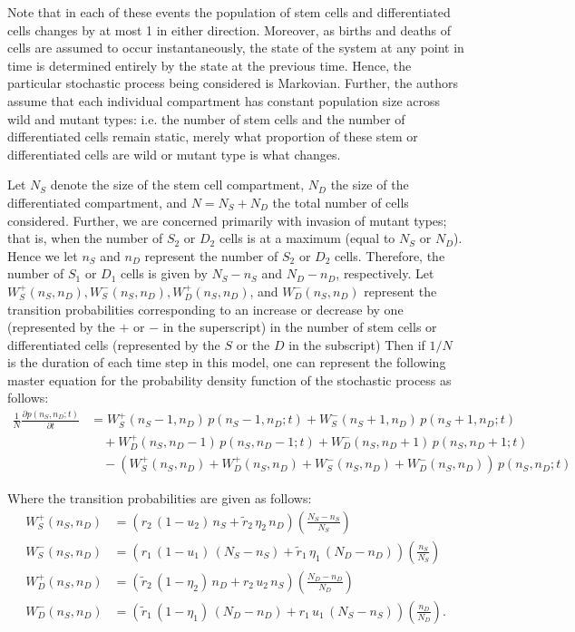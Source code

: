 \documentclass[12pt]{article}
\begin{document}
Note that in each of these events the population of stem cells and differentiated cells changes by at most 1 in either direction. Moreover, as births and deaths of cells are assumed to occur instantaneously, the state of the system at any point in time is determined entirely by the state at the previous time. Hence, the particular stochastic process being considered is Markovian. Further, the authors assume that each individual compartment has constant population size across wild and mutant types: i.e. the number of stem cells and the number of differentiated cells remain static, merely what proportion of these stem or differentiated cells are wild or mutant type is what changes. 

Let $N_S$ denote the size of the stem cell compartment, $N_D$ the size of the differentiated compartment, and $N=N_S+N_D$ the total number of cells considered. Further, we are concerned primarily with invasion of mutant types; that is, when the number of $S_2$ or $D_2$ cells is at a maximum (equal to $N_S$ or $N_D$). Hence we let $n_S$ and $n_D$ represent the number of $S_2$ or $D_2$ cells. Therefore, the number of $S_1$ or $D_1$ cells is given by $N_S-n_S$ and $N_D-n_D$, respectively. Let $W_S^+(n_S,n_D), W_S^-(n_S,n_D), W_D^+(n_S,n_D)$, and $W_D^-(n_S,n_D)$ represent the transition probabilities corresponding to an increase or decrease by one (represented by the $+$ or $-$ in the superscript) in the number of stem cells or differentiated cells (represented by the $S$ or the $D$ in the subscript) Then if $1/N$ is the duration of each time step in this model, one can represent the following master equation for the probability density function of the stochastic process as follows:
\begin{align}
\frac{1}{N}\frac{\partial p(n_S,n_D;t)}{\partial t}&=W_S^+(n_S-1,n_D)\, p(n_S-1,n_D;t) + W_S^-(n_S+1,n_D)\, p(n_S+1,n_D;t)\nonumber\\
&\quad
+ W_D^+(n_S,n_D-1)\, p(n_S,n_D-1;t) + W_D^-(n_S,n_D+1)\, p(n_S,n_D+1;t)\nonumber\\
&\quad
-(W_S^+(n_S,n_D)+W_D^+(n_S,n_D)+W_S^-(n_S,n_D)+W_D^-(n_S,n_D))\, p(n_S,n_D;t)
\label{MohRef1}
\end{align}

Where the transition probabilities are given as follows:
\begin{align}
W_S^+(n_S,n_D) &= \left(r_2\,(1-u_2)\,n_S+\tilde{r}_2\,\eta_2\,n_D\right)\left(\frac{N_S-n_S}{N_S}\right)\label{MohRef2}\\
W_S^-(n_S,n_D) &= \left(r_1\,(1-u_1)\,(N_S-n_S)+\tilde{r}_1\,\eta_1\,(N_D-n_D)\right)\left(\frac{n_S}{N_S}\right)\\
W_D^+(n_S,n_D) &= \left(\tilde{r}_2\,(1-\eta_2)\,n_D+r_2\,u_2\,n_S\right)\left(\frac{N_D-n_D}{N_D}\right)\\
W_D^-(n_S,n_D) &= \left(\tilde{r}_1\,(1-\eta_1)\,(N_D-n_D)+r_1\,u_1\,(N_S-n_S)\right)\left(\frac{n_D}{N_D}\right).
\label{MohRef3}
\end{align}
\end{document}
